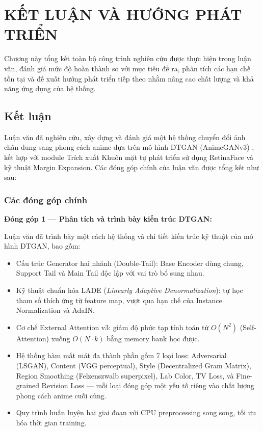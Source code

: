 \clearpage


\setcounter{chapter}{4}
\chapter[{KẾT LUẬN VÀ HƯỚNG PHÁT TRIỂN}]{KẾT LUẬN VÀ HƯỚNG PHÁT TRIỂN}

Chương này tổng kết toàn bộ công trình nghiên cứu được thực hiện trong luận văn, đánh giá mức độ hoàn thành so với mục tiêu đề ra, phân tích các hạn chế tồn tại và đề xuất hướng phát triển tiếp theo nhằm nâng cao chất lượng và khả năng ứng dụng của hệ thống.

\section{Kết luận}
\label{sec:conclusion}

Luận văn đã nghiên cứu, xây dựng và đánh giá một hệ thống chuyển đổi ảnh chân dung sang phong cách anime dựa trên mô hình DTGAN (AnimeGANv3) \cite{Liu2024}, kết hợp với module Trích xuất Khuôn mặt tự phát triển sử dụng RetinaFace \cite{Deng2019RetinaFace} và kỹ thuật Margin Expansion. Các đóng góp chính của luận văn được tổng kết như sau:

\subsection{Các đóng góp chính}
\label{subsec:contributions}

\textbf{Đóng góp 1 — Phân tích và trình bày kiến trúc DTGAN:}

Luận văn đã trình bày một cách hệ thống và chi tiết kiến trúc kỹ thuật của mô hình DTGAN, bao gồm:
\begin{itemize}
    \item Cấu trúc Generator hai nhánh (Double-Tail): Base Encoder dùng chung, Support Tail và Main Tail độc lập với vai trò bổ sung nhau.
    \item Kỹ thuật chuẩn hóa LADE (\textit{Linearly Adaptive Denormalization}): tự học tham số thích ứng từ feature map, vượt qua hạn chế của Instance Normalization và AdaIN.
    \item Cơ chế External Attention v3: giảm độ phức tạp tính toán từ $O(N^2)$ (Self-Attention) xuống $O(N \cdot k)$ bằng memory bank học được.
    \item Hệ thống hàm mất mát đa thành phần gồm 7 loại loss: Adversarial (LSGAN), Content (VGG perceptual), Style (Decentralized Gram Matrix), Region Smoothing (Felzenszwalb superpixel), Lab Color, TV Loss, và Fine-grained Revision Loss — mỗi loại đóng góp một yếu tố riêng vào chất lượng phong cách anime cuối cùng.
    \item Quy trình huấn luyện hai giai đoạn với CPU preprocessing song song, tối ưu hóa thời gian training.
\end{itemize}

